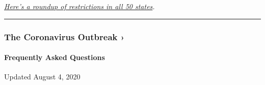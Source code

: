 \href{https://www.nytimes.com/interactive/2020/us/states-reopen-map-coronavirus.html}{\emph{Here's
a roundup of restrictions in all 50 states}}\emph{.}

\begin{center}\rule{0.5\linewidth}{\linethickness}\end{center}

\href{https://www.nytimes.com/news-event/coronavirus?action=click\&pgtype=Article\&state=default\&region=MAIN_CONTENT_3\&context=storylines_faq}{}

\hypertarget{the-coronavirus-outbreak-}{%
\subsubsection{The Coronavirus Outbreak
›}\label{the-coronavirus-outbreak-}}

\hypertarget{frequently-asked-questions}{%
\paragraph{Frequently Asked
Questions}\label{frequently-asked-questions}}

Updated August 4, 2020

